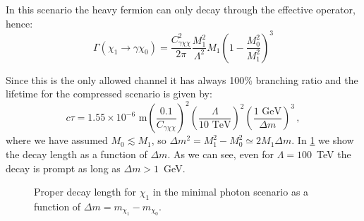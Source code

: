 \documentclass[a4paper,11pt]{article}
\begin{document}
In this scenario the heavy fermion can only decay through the effective operator, hence:
\begin{equation}
	\Gamma (\chi_1 \to \gamma \chi_0) = \frac{C_{\gamma\chi\chi}^2}{2 \pi} \frac{M_1^2}{\Lambda^2} M_1 \left(1-\frac{M_0^2}{M_1^2}\right)^3
\end{equation} 

Since this is the only allowed channel it has always 100\% branching ratio and the lifetime for the compressed scenario is given by:
\begin{equation}
	c \tau = 1.55 \times 10^{-6} \mbox{ m} \left(\frac{0.1}{C_{\gamma\chi\chi}}\right)^2 \left(\frac{\Lambda}{10\mbox{ TeV}}\right)^2 \left(\frac{1 \mbox{ GeV}}{\Delta m}\right)^{3}\, ,
\end{equation}
where we have assumed $M_0 \lesssim M_1$, so $\Delta m^2 = M_1^2 - M_0^2 \simeq 2 M_1 \Delta m$. In \cref{fig:chi1_lifetimeA} we show the decay length as a function of $\Delta m$. As we can see, even for $\Lambda = 100$~TeV the decay is prompt as long as $\Delta m > 1$~GeV.

\begin{figure}
	\centering
	\caption{Proper decay length for $\chi_1$ in the minimal photon scenario as a function of $\Delta m = m_{\chi_1} - m_{\chi_0}$.} \label{fig:chi1_lifetimeA}
\end{figure}

%
%
\end{document}
